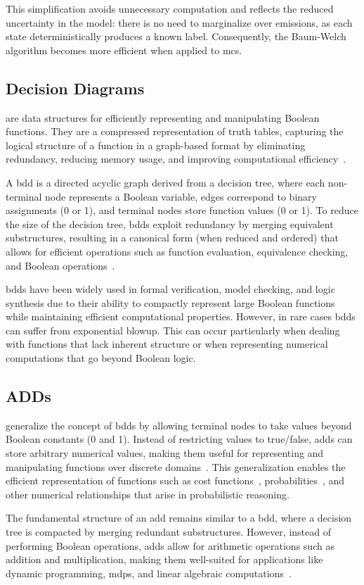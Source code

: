 This simplification avoids unnecessary computation and reflects the reduced uncertainty in the model: there is no need to marginalize over emissions, as each state deterministically produces a known label.
Consequently, the Baum-Welch algorithm becomes more efficient when applied to \glspl{mc}.

\subsection{Decision Diagrams}\label{subsec:decision-diagrams}
 are data structures for efficiently representing and manipulating Boolean functions.
They are a compressed representation of truth tables, capturing the logical structure of a function in a graph-based format by eliminating redundancy, reducing memory usage, and improving computational efficiency~\cite{bryant1986graph}.

A \gls{bdd} is a directed acyclic graph derived from a decision tree, where each non-terminal node represents a Boolean variable, edges correspond to binary assignments (0 or 1), and terminal nodes store function values (0 or 1).
To reduce the size of the decision tree, \glspl{bdd} exploit redundancy by merging equivalent substructures, resulting in a canonical form (when reduced and ordered) that allows for efficient operations such as function evaluation, equivalence checking, and Boolean operations~\cite{bryant1986graph}.

\glspl{bdd} have been widely used in formal verification, model checking, and logic synthesis due to their ability to compactly represent large Boolean functions while maintaining efficient computational properties.
However, in rare cases \glspl{bdd} can suffer from exponential blowup. This can occur particularly when dealing with functions that lack inherent structure or when representing numerical computations that go beyond Boolean logic.

\subsection{ADDs}\label{subsec:adds}
 generalize the concept of \glspl{bdd} by allowing terminal nodes to take values beyond Boolean constants (0 and 1).
Instead of restricting values to true/false, \glspl{add} can store arbitrary numerical values, making them useful for representing and manipulating functions over discrete domains~\cite{bahar1997algebric}.
This generalization enables the efficient representation of functions such as cost functions~\cite{kwiatkowska2004probabilistic}, probabilities~\cite{baier1997symbolic}, and other numerical relationships that arise in probabilistic reasoning.

The fundamental structure of an \gls{add} remains similar to a \gls{bdd}, where a decision tree is compacted by merging redundant substructures.
However, instead of performing Boolean operations, \glspl{add} allow for arithmetic operations such as addition and multiplication, making them well-suited for applications like dynamic programming, \glspl{mdp}, and linear algebraic computations~\cite{bahar1997algebric}.